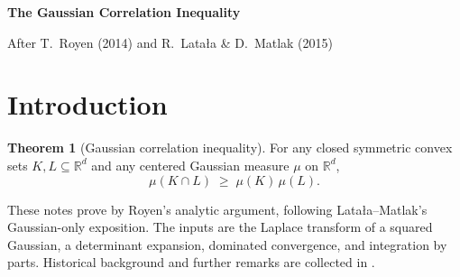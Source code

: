\documentclass[12pt,a4paper]{article}
\theoremstyle{definition}
\newtheorem{theorem}{Theorem}[section]
\newcommand{\R}{\mathbb{R}}
\begin{document}
\begingroup
\centering
{\LARGE\bfseries The Gaussian Correlation Inequality\par}
\vspace{2pt}
{\normalsize After T.\ Royen (2014) and R.\ Lata{\l}a \& D.\ Matlak (2015)\par}
\vspace{4pt}
\endgroup


\section{Introduction}\label{sec:intro}

\begin{theorem}[Gaussian correlation inequality]\label{thm:gcc_geom}
  For any closed symmetric convex sets $K,L\subseteq\R^d$ and any
  centered Gaussian measure $\mu$ on $\R^d$,
  \begin{equation}\label{eq:gcc}
    \mu(K\cap L)\;\geqslant\;\mu(K)\,\mu(L).
  \end{equation}
\end{theorem}

These notes prove  by Royen's analytic argument,
following Lata{\l}a--Matlak's Gaussian-only exposition.  The inputs
are the Laplace transform of a squared Gaussian, a determinant
expansion, dominated convergence, and integration by parts.
Historical background and further remarks are collected in
.
\end{document}
